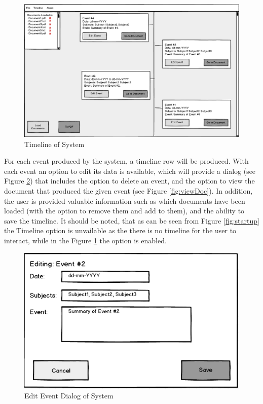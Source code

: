 \begin{figure}[h]
\caption{Timeline of System}
\label{fig:timeline}
\includegraphics[width=\linewidth]{timeline.png}
\centering
\end{figure}
\par For each event produced by the system, a timeline row will be produced. With each event an option to edit its data is available, which will provide a dialog (see Figure \ref{fig:editDialog}) that includes the option to delete an event, and the option to view the document that produced the given event (see Figure \ref{fig:viewDoc}). In addition, the user is provided valuable information such as which documents have been loaded (with the option to remove them and add to them), and the ability to save the timeline. It should be noted, that as can be seen from Figure \ref{fig:startup} the Timeline option is unvailable as the there is no timeline for the user to interact, while in the Figure \ref{fig:timeline} the option is enabled.
\begin{figure}[h]
\caption{Edit Event Dialog of System}
\label{fig:editDialog}
\includegraphics[scale=0.6]{editDialog.png}
\centering
\end{figure}
